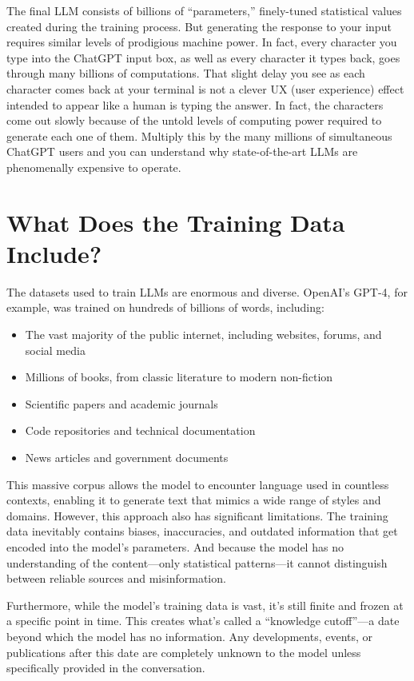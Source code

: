 \documentclass[
  Letterpaper,
]{scrbook}
\providecommand{\tightlist}{%
  \setlength{\itemsep}{0pt}\setlength{\parskip}{0pt}}\usepackage{longtable,booktabs,array}
\begin{document}
The final LLM consists of billions of ``parameters,'' finely-tuned
statistical values created during the training process. But generating
the response to your input requires similar levels of prodigious machine
power. In fact, every character you type into the ChatGPT input box, as
well as every character it types back, goes through many billions of
computations. That slight delay you see as each character comes back at
your terminal is not a clever UX (user experience) effect intended to
appear like a human is typing the answer. In fact, the characters come
out slowly because of the untold levels of computing power required to
generate each one of them. Multiply this by the many millions of
simultaneous ChatGPT users and you can understand why state-of-the-art
LLMs are phenomenally expensive to operate.

\section{What Does the Training Data
Include?}\label{what-does-the-training-data-include}

The datasets used to train LLMs are enormous and diverse. OpenAI's
GPT-4, for example, was trained on hundreds of billions of words,
including:

\begin{itemize}
\tightlist
\item
  The vast majority of the public internet, including websites, forums,
  and social media
\item
  Millions of books, from classic literature to modern non-fiction
\item
  Scientific papers and academic journals
\item
  Code repositories and technical documentation
\item
  News articles and government documents
\end{itemize}

This massive corpus allows the model to encounter language used in
countless contexts, enabling it to generate text that mimics a wide
range of styles and domains. However, this approach also has significant
limitations. The training data inevitably contains biases, inaccuracies,
and outdated information that get encoded into the model's parameters.
And because the model has no understanding of the content---only
statistical patterns---it cannot distinguish between reliable sources
and misinformation.

Furthermore, while the model's training data is vast, it's still finite
and frozen at a specific point in time. This creates what's called a
``knowledge cutoff''---a date beyond which the model has no information.
Any developments, events, or publications after this date are completely
unknown to the model unless specifically provided in the conversation.
\end{document}
